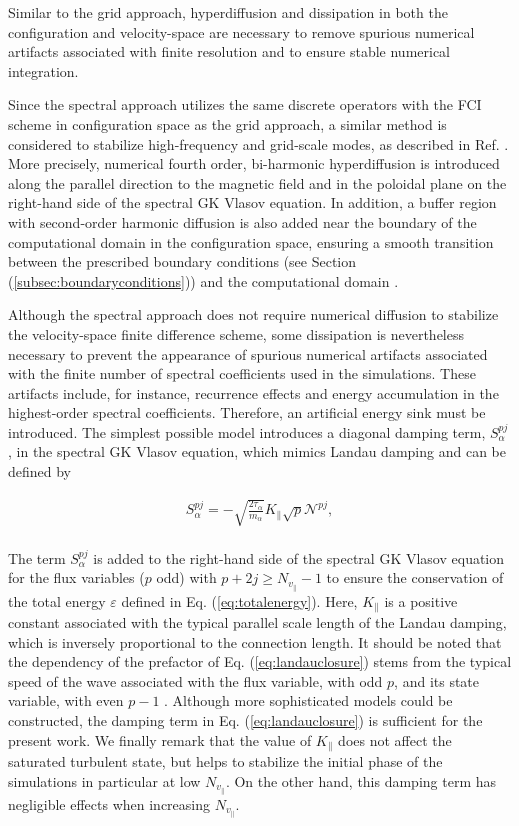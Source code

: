\documentclass[preprint,12pt]{elsarticle}
\begin{document}
Similar to the grid approach, hyperdiffusion and dissipation in both the configuration and velocity-space are necessary to remove spurious numerical artifacts associated with finite resolution and to ensure stable numerical integration.

Since the spectral approach utilizes the same discrete operators with the FCI scheme in configuration space as the grid approach, a similar method is considered to stabilize high-frequency and grid-scale modes, as described in Ref. \cite{michels2021}. More precisely, numerical fourth order, bi-harmonic hyperdiffusion is introduced along the parallel direction to the magnetic field and in the poloidal plane on the right-hand side of the spectral GK Vlasov equation. In addition, a buffer region with second-order harmonic diffusion is also added near the boundary of the computational domain in the configuration space, ensuring a smooth transition between the prescribed boundary conditions (see Section (\ref{subsec:boundaryconditions})) and the computational domain \cite{michels2021}.

Although the spectral approach does not require numerical diffusion to stabilize the velocity-space finite difference scheme, some dissipation is nevertheless necessary to prevent the appearance of spurious numerical artifacts associated with the finite number of spectral coefficients used in the simulations. These artifacts include, for instance, recurrence effects \cite{frei2023} and energy accumulation in the highest-order spectral coefficients. Therefore, an artificial energy sink must be introduced. The simplest possible model introduces a diagonal damping term, $S_\alpha^{pj}$, in the spectral GK Vlasov equation, which mimics Landau damping and can be defined by \cite{scott2021}

\begin{align} \label{eq:landauclosure}
S_\alpha^{pj} = - \sqrt{\frac{2 \tau_\alpha}{m_\alpha}} K_\parallel \sqrt{p} \mathcal{N}^{pj},
\end{align}
\\
The term $S_\alpha^{pj}$ is added to the right-hand side of the spectral GK Vlasov equation for the flux variables ($p$ odd) with $p + 2j \geq N_{v_\parallel} - 1$ to ensure the conservation of the total energy $\varepsilon$ defined in Eq. (\ref{eq:totalenergy}). Here, $K_\parallel$ is a positive constant associated with the typical parallel scale length of the Landau damping, which is inversely proportional to the connection length. It should be noted that the dependency of the prefactor of Eq. (\ref{eq:landauclosure}) stems from the typical speed of the wave associated with the flux variable, with odd $p$, and its state variable, with even $p - 1$ \cite{scott2021}. Although more sophisticated models could be constructed, the damping term in Eq. (\ref{eq:landauclosure}) is sufficient for the present work. We finally remark that the value of $K_\parallel$ does not affect the saturated turbulent state, but helps to stabilize the initial phase of the simulations in particular at low $N_{v_\parallel}$. On the other hand, this damping term has negligible effects when increasing $N_{v_\parallel}$.
\end{document}

